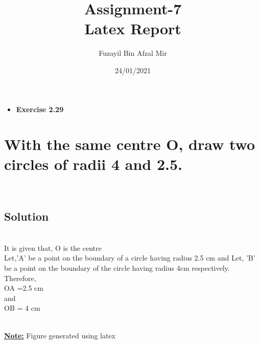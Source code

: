 \documentclass[a4paper,12pt]{article}
\title{Assignment-7\\ Latex Report}
\author{Fuzayil Bin Afzal Mir}
\date{24/01/2021}
\begin{document}
	\maketitle
	

 \newpage
 \begin{itemize}
	    \item \Large\textbf{Exercise 2.29}
	\end{itemize}
	\section{With the same centre O, draw two circles of radii 4 and 2.5.}\\
    	
\subsection{Solution} \\
It is given that,
O is the centre\\ 
 Let,'A' be a point on the boundary of a circle having radius 2.5 cm and 
  Let, 'B' be a point on the boundary of the circle having radius 4cm respectively.
 \\Therefore,\\ OA =2.5 cm\\
 and\\ OB = 4 cm\\
  
  
  


\\

\textbf{\underline{Note:}} {Figure generated using latex}\\
\end{document}
